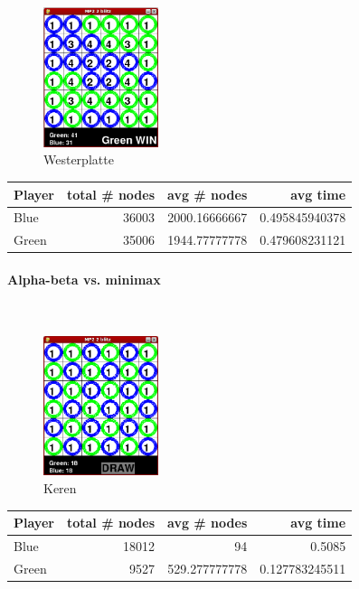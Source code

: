 \begin{multicols*}{2}
\begin{figure}[H]
\centering
\includegraphics[width=0.3\textwidth]{graphics/aa_westerplatte.png}
\caption{Westerplatte}
\end{figure}
\begin{tabular}{l|r|r|r}
  Player & total \# nodes & avg \# nodes & avg time \\
  \hline
  Blue & 36003 & 2000.16666667 & 0.495845940378 \\
  Green & 35006 & 1944.77777778 & 0.479608231121 \\
\end{tabular}

\paragraph*{Alpha-beta vs. minimax}
\mbox{}\\
\begin{figure}[H]
\centering
\includegraphics[width=0.3\textwidth]{graphics/am_keren.png}
\caption{Keren}
\end{figure}
\begin{tabular}{l|r|r|r}
  Player & total \# nodes & avg \# nodes & avg time \\
  \hline
  Blue & 18012 & 94 & 0.5085 \\
  Green & 9527 & 529.277777778 & 0.127783245511 \\
\end{tabular}


\end{multicols*}
